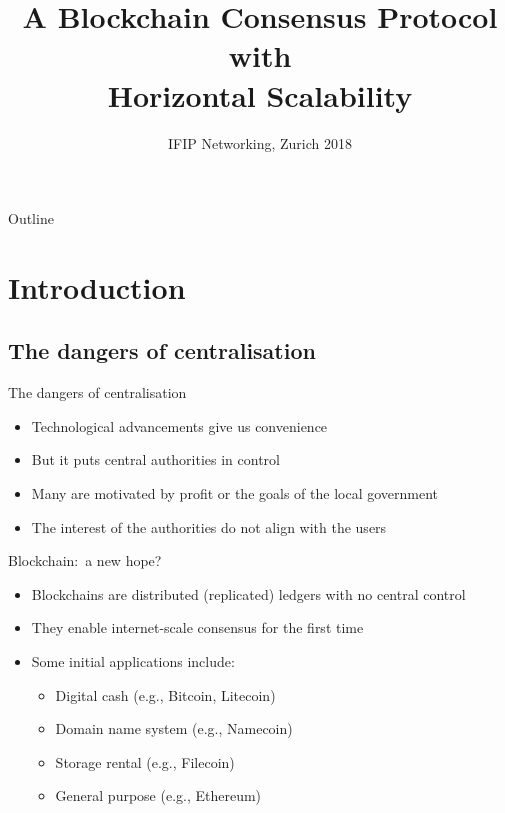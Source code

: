 \documentclass{beamer}
\title{A Blockchain Consensus Protocol with\\Horizontal Scalability}
\author[Short Name (U ABC)]{%
  \texorpdfstring{%
    \begin{columns}
      \column{.3333\linewidth}
      \centering
      Kelong~Cong \\ \small kelong.cong@epfl.ch \\ EPFL
      \column{.3333\linewidth}
      \centering
      Zhijie~Ren \\ \small z.ren@tudelft.nl \\ TU Delft
      \column{.3333\linewidth}
      \centering
      Johan~Pouwelse \\ \small peer2peer@gmail.com \\ TU Delft
    \end{columns}
 }
 {Kelong~Cong, Zhijie~Ren, Johan~Pouwelse}
}
\date{IFIP Networking, Zurich 2018}
\begin{document}
\begin{frame}
  \titlepage

\end{frame}

\begin{frame}{Outline}
  \tableofcontents[]
\end{frame}

\section{Introduction}
\subsection{The dangers of centralisation}
\begin{frame}{The dangers of centralisation}
  \begin{itemize}
    \item Technological advancements give us convenience
    \item But it puts central authorities in control
    \item Many are motivated by profit or the goals of the local government
    \item The interest of the authorities do not align with the users
  \end{itemize}
\end{frame}

\begin{frame}{Blockchain:~a new hope?}
  \begin{itemize}
    \item Blockchains are distributed (replicated) ledgers with no central control
    \item They enable internet-scale consensus for the first time
    \item Some initial applications include:
    \begin{itemize}
      \item Digital cash (e.g., Bitcoin, Litecoin)
      \item Domain name system (e.g., Namecoin)
      \item Storage rental (e.g., Filecoin)
      \item General purpose (e.g., Ethereum)
    \end{itemize}
  \end{itemize}
\end{frame}
\end{document}
